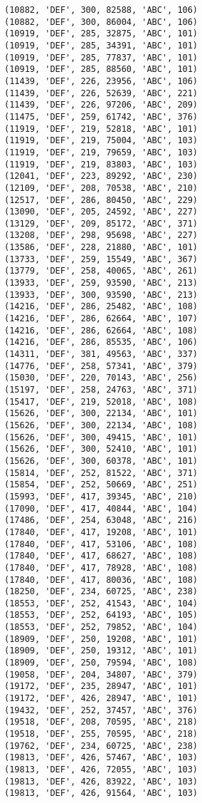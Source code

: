 \begin{verbatim}
(10882, 'DEF', 300, 82588, 'ABC', 106)
(10882, 'DEF', 300, 86004, 'ABC', 106)
(10919, 'DEF', 285, 32875, 'ABC', 101)
(10919, 'DEF', 285, 34391, 'ABC', 101)
(10919, 'DEF', 285, 77837, 'ABC', 101)
(10919, 'DEF', 285, 88560, 'ABC', 101)
(11439, 'DEF', 226, 23956, 'ABC', 106)
(11439, 'DEF', 226, 52639, 'ABC', 221)
(11439, 'DEF', 226, 97206, 'ABC', 209)
(11475, 'DEF', 259, 61742, 'ABC', 376)
(11919, 'DEF', 219, 52818, 'ABC', 101)
(11919, 'DEF', 219, 75004, 'ABC', 103)
(11919, 'DEF', 219, 79659, 'ABC', 103)
(11919, 'DEF', 219, 83803, 'ABC', 103)
(12041, 'DEF', 223, 89292, 'ABC', 230)
(12109, 'DEF', 208, 70538, 'ABC', 210)
(12517, 'DEF', 286, 80450, 'ABC', 229)
(13090, 'DEF', 205, 24592, 'ABC', 227)
(13129, 'DEF', 209, 85172, 'ABC', 371)
(13208, 'DEF', 298, 95698, 'ABC', 227)
(13586, 'DEF', 228, 21880, 'ABC', 101)
(13733, 'DEF', 259, 15549, 'ABC', 367)
(13779, 'DEF', 258, 40065, 'ABC', 261)
(13933, 'DEF', 259, 93590, 'ABC', 213)
(13933, 'DEF', 300, 93590, 'ABC', 213)
(14216, 'DEF', 286, 25482, 'ABC', 108)
(14216, 'DEF', 286, 62664, 'ABC', 107)
(14216, 'DEF', 286, 62664, 'ABC', 108)
(14216, 'DEF', 286, 85535, 'ABC', 106)
(14311, 'DEF', 381, 49563, 'ABC', 337)
(14776, 'DEF', 258, 57341, 'ABC', 379)
(15030, 'DEF', 220, 70143, 'ABC', 256)
(15197, 'DEF', 258, 24763, 'ABC', 371)
(15417, 'DEF', 219, 52018, 'ABC', 108)
(15626, 'DEF', 300, 22134, 'ABC', 101)
(15626, 'DEF', 300, 22134, 'ABC', 108)
(15626, 'DEF', 300, 49415, 'ABC', 101)
(15626, 'DEF', 300, 52410, 'ABC', 101)
(15626, 'DEF', 300, 60378, 'ABC', 101)
(15814, 'DEF', 252, 81522, 'ABC', 371)
(15854, 'DEF', 252, 50669, 'ABC', 251)
(15993, 'DEF', 417, 39345, 'ABC', 210)
(17090, 'DEF', 417, 40844, 'ABC', 104)
(17486, 'DEF', 254, 63048, 'ABC', 216)
(17840, 'DEF', 417, 19208, 'ABC', 101)
(17840, 'DEF', 417, 53106, 'ABC', 108)
(17840, 'DEF', 417, 68627, 'ABC', 108)
(17840, 'DEF', 417, 78928, 'ABC', 108)
(17840, 'DEF', 417, 80036, 'ABC', 108)
(18250, 'DEF', 234, 60725, 'ABC', 238)
(18553, 'DEF', 252, 41543, 'ABC', 104)
(18553, 'DEF', 252, 64193, 'ABC', 105)
(18553, 'DEF', 252, 79852, 'ABC', 104)
(18909, 'DEF', 250, 19208, 'ABC', 101)
(18909, 'DEF', 250, 19312, 'ABC', 101)
(18909, 'DEF', 250, 79594, 'ABC', 108)
(19058, 'DEF', 204, 34807, 'ABC', 379)
(19172, 'DEF', 235, 28947, 'ABC', 101)
(19172, 'DEF', 426, 28947, 'ABC', 101)
(19432, 'DEF', 252, 37457, 'ABC', 376)
(19518, 'DEF', 208, 70595, 'ABC', 218)
(19518, 'DEF', 255, 70595, 'ABC', 218)
(19762, 'DEF', 234, 60725, 'ABC', 238)
(19813, 'DEF', 426, 57467, 'ABC', 103)
(19813, 'DEF', 426, 72055, 'ABC', 103)
(19813, 'DEF', 426, 83922, 'ABC', 103)
(19813, 'DEF', 426, 91564, 'ABC', 103)

\end{verbatim}
